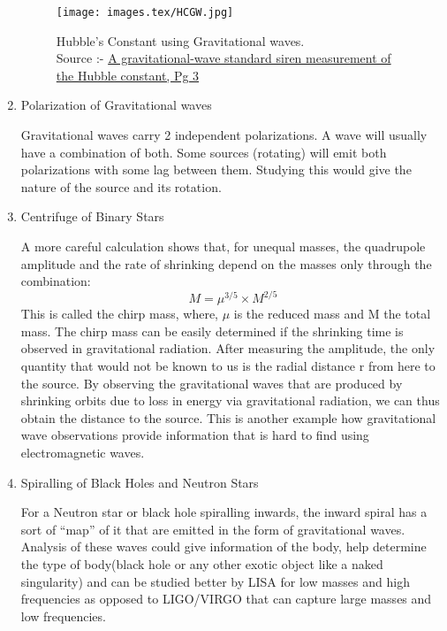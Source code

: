 \begin{enumerate}
        \begin{figure}[h]
            \centering
            \texttt{[image: images.tex/HCGW.jpg]}
            \caption{Hubble's Constant using Gravitational waves.\\
            Source :- \href{https://www.researchgate.net/profile/Michael-Ross-9/publication/324600496}{A gravitational-wave standard siren measurement of the Hubble constant, Pg 3}}
        \end{figure}

    \item Polarization of Gravitational waves
    
    \hspace{1cm}Gravitational waves carry 2 independent polarizations. A wave will usually have a combination of both. Some sources (rotating) will emit both polarizations with some lag between them. Studying this would give the nature of the source and its rotation.\\

    \item Centrifuge of Binary Stars
    
    \hspace{1cm}A more careful calculation shows that, for unequal masses, the quadrupole amplitude and the rate of shrinking depend on the masses only through the combination:
    \begin{equation}
    \ M=\mu^{3/5} \times M^{2/5}\
    \end{equation}
    \hspace{1cm}This is called the chirp mass, where, $\mu$ is the reduced mass and M the total mass. The chirp mass can be easily determined if the shrinking time is observed in gravitational radiation. After measuring the amplitude, the only quantity that would not be known to us is the radial distance r from here to the source. By observing the gravitational waves that are produced by shrinking orbits due to loss in energy via gravitational radiation, we can thus obtain the distance to the source. This is another example how gravitational wave observations provide information that is hard to find using electromagnetic waves.\\

    \item Spiralling of Black Holes and Neutron Stars
    
    \hspace{1cm}For a Neutron star or black hole spiralling inwards, the inward spiral has a sort of “map” of it that are emitted in the form of gravitational waves. Analysis of these waves could give information of the body, help determine the type of body(black hole or any other exotic object like a naked singularity)  and can be studied better by LISA for low masses and high frequencies as opposed to LIGO/VIRGO that can capture large masses and low frequencies.\\
    


\end{enumerate}
